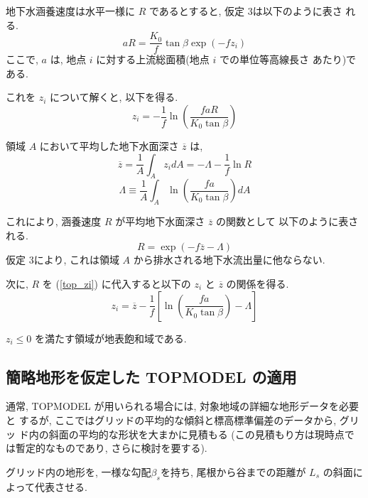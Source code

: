 地下水涵養速度は水平一様に $R$ であるとすると, 仮定 3は以下のように表さ
れる.
\begin{equation}
 a R = \frac{K_0}{f} \tan\beta \exp(-f z_i)
\end{equation}
ここで, $a$ は, 地点 $i$ に対する上流総面積(地点 $i$ での単位等高線長さ
あたり)である.

これを $z_i$ について解くと, 以下を得る.
\begin{equation}
 z_i = -\frac{1}{f} \ln \left( \frac{faR}{K_0 \tan \beta}\right)
 \label{top_zi}
\end{equation}

領域 $A$ において平均した地下水面深さ $\overline{z}$ は,
\begin{equation}
   \overline{z} = \frac1{A}\int_{A} z_i dA
  = - \Lambda - \frac1{f} \ln R
 \label{top_zbar}
\end{equation}
\begin{equation}
 \Lambda \equiv
  \frac1{A}\int_{A} \ln \left( \frac{fa}{K_0 \tan \beta}\right) dA
\end{equation}

これにより, 涵養速度 $R$ が平均地下水面深さ $\overline{z}$ の関数として
以下のように表される.
\begin{equation}
 R = \exp (-f \overline{z} -\Lambda)
 \label{top_r}
\end{equation}
仮定 3により, これは領域 $A$ から排水される地下水流出量に他ならない.

次に, $R$ を (\ref{top_zi}) に代入すると以下の $z_i$ と $\overline{z}$
の関係を得る.
\begin{equation}
 z_i = \overline{z} - \frac{1}{f} \left[
\ln \left( \frac{fa}{K_0 \tan \beta}\right) - \Lambda
\right]
 \label{top_zizbar}
\end{equation}

$z_i \leq 0$ を満たす領域が地表飽和域である.

\subsection{簡略地形を仮定した TOPMODEL の適用}

通常, TOPMODEL が用いられる場合には, 対象地域の詳細な地形データを必要と
するが, ここではグリッドの平均的な傾斜と標高標準偏差のデータから, グリッ
ド内の斜面の平均的な形状を大まかに見積もる
(この見積もり方は現時点では暫定的なものであり, さらに検討を要する).

グリッド内の地形を, 一様な勾配$\beta_s$を持ち, 尾根から谷までの距離が
$L_s$ の斜面によって代表させる.

